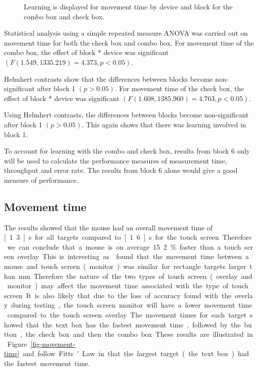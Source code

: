 \documentclass{elsart}
\begin{document}
\begin{figure}
	\caption{Learning is displayed for movement time by device and block
	for the combo box and check box.}
	\label{fig-movement-time-learning}
\end{figure}

Statistical analysis using a simple repeated measure ANOVA was carried
out on movement time for both the check box and combo box. For movement
time of the combo box, the effect of block * device was significant
\((F(1.549, 1335.219) = 4.373, p < 0.05)\).

Helmhert contrasts show that the differences between blocks become
non-significant after block 1 \((p > 0.05)\). For movement time of the
check box, the effect of block * device was significant \((F(1.608,
1385.960) = 4.763, p < 0.05)\).

Using Helmhert contrasts, the differences between blocks become
non-significant after block 1 \((p > 0.05)\). This again shows that
there was learning involved in block 1.

To account for learning with the combo and check box, results from block
6 only will be used to calculate the performance measures of measurement
time, throughput and error rate. The results from block 6 alone would
give a good measure of performance.

\subsection{Movement time}
\label{sec-results-movement}

The results showed that the mouse had an overall movement time of
\unit[1.3]{s} for all targets compared to \unit[1.6]{s} for the touch
screen. Therefore we can conclude that a mouse is on average 15.2\%
faster than a touch screen overlay. This is interesting as
\citet{Sear-A-1991-IJMMS} found that the movement time between a mouse
and touch screen (monitor) was similar for rectangle targets larger than
\unit[2]{mm}. Therefore the nature of the two types of touch screen
(overlay and monitor) may affect the movement time associated with the
type of touch screen. It is also likely that due to the loss of accuracy
found with the overlay during testing, the touch screen monitor will
have a lower movement time compared to the touch screen overlay.

The movement times for each target showed that the text box has the
fastest movement time, followed by the button, the check box and then
the combo box. These results are illustrated in
Figure~\ref{fig-movement-time} and follow Fitts' Law in that the largest
target (the text box) had the fastest movement time.
\end{document}
